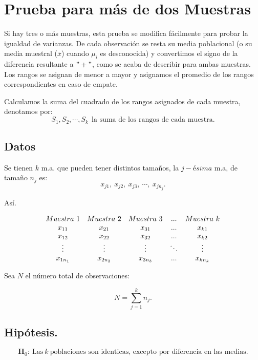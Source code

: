 \documentclass[
  a4paper,
  oneside,
  openany]{book}
\begin{document}
\hypertarget{prueba-para-muxe1s-de-dos-muestras}{%
\chapter{Prueba para más de dos Muestras}\label{prueba-para-muxe1s-de-dos-muestras}}

Si hay tres o más muestras, esta prueba se modifica fácilmente para probar la igualdad de varianzas. De cada observación se resta su media poblacional (o su media muestral (\(\overline{x}\)) cuando \(\mu_{i}\) es desconocida) y convertimos el signo de la diferencia resultante a \("+"\), como se acaba de describir para ambas muestras.
Los rangos se asignan de menor a mayor y asignamos el promedio de los rangos correspondientes en caso de empate.

Calculamos la suma del cuadrado de los rangos asignados de cada muestra, denotamos por: \[S_{1},S_{2},\cdots,S_{k} \  \ \mbox{la suma de los rangos de cada muestra.}\]

\hypertarget{datos-9}{%
\section{Datos}\label{datos-9}}

Se tienen \(k\) m.a. que pueden tener distintos tamaños, la \(j-ésima\) m.a, de tamaño \(n_j\) es: \[x_{j1},\ x_{j2},\ x_{j3},\ \cdots, \ x_{jn_j}.\]

Así.

\[
\begin{array}{c c c c c} 
Muestra \ 1&Muestra\ 2&Muestra\ 3&...& Muestra\ k \\
x_{11}&x_{21}&x_{31}&...&x_{k1}\\
x_{12}&x_{22}&x_{32}&...&x_{k2}\\
\vdots&\vdots&\vdots&\ddots&\vdots\\
x_{1n_1}&x_{2n_2}&x_{3n_3}&...&x_{kn_k}\\
\end{array}
\]

Sea \(N\) el número total de observaciones:

\[N=\sum_{j=1}^k n_{j}.\]

\hypertarget{hipuxf3tesis.}{%
\section{Hipótesis.}\label{hipuxf3tesis.}}

\[\textbf{H}_0: \ \mbox{Las} \  k  \ \mbox{poblaciones son identicas, excepto por diferencia en las medias.}\]
\end{document}
